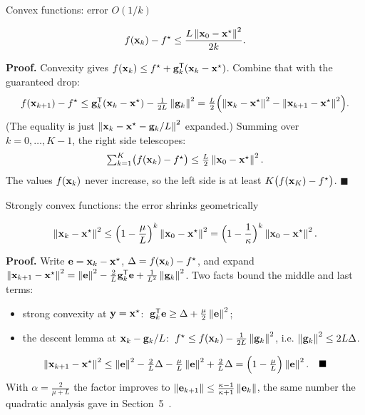 \begin{frame}{Convex functions: error $O(1/k)$}
  \begin{thmbox}[Theorem ($L$-smooth, convex, $\alpha = 1/L$)]
    \[ f(\mathbf{x}_k) - f^\star \le \frac{L\left\lVert \mathbf{x}_0-\mathbf{x}^\star \right\rVert^2}{2k}. \]
  \end{thmbox}
  \small\textbf{Proof.}
  \pause
  Convexity gives $f(\mathbf{x}_k)\le f^\star + \mathbf{g}_k^{\mathsf T}(\mathbf{x}_k-\mathbf{x}^\star)$. Combine that with the guaranteed drop:
  \[
    f(\mathbf{x}_{k+1}) - f^\star \le \mathbf{g}_k^{\mathsf T}(\mathbf{x}_k-\mathbf{x}^\star) - \tfrac{1}{2L}\left\lVert \mathbf{g}_k \right\rVert^2
    = \tfrac L2\Bigl(\left\lVert \mathbf{x}_k-\mathbf{x}^\star \right\rVert^2 - \left\lVert \mathbf{x}_{k+1}-\mathbf{x}^\star \right\rVert^2\Bigr).
  \]
  \pause
  (The equality is just $\left\lVert \mathbf{x}_k - \mathbf{x}^\star - \mathbf{g}_k/L \right\rVert^2$ expanded.) Summing over $k = 0,\dots,K-1$, the right side
  telescopes:
  \[
    \textstyle\sum_{k=1}^{K}\bigl(f(\mathbf{x}_k)-f^\star\bigr)\le\tfrac L2\left\lVert \mathbf{x}_0-\mathbf{x}^\star \right\rVert^2 .
  \]
  \pause
  The values $f(\mathbf{x}_k)$ never increase, so the left side is at least $K\bigl(f(\mathbf{x}_K)-f^\star\bigr)$. $\blacksquare$
\end{frame}

\begin{frame}{Strongly convex functions: the error shrinks geometrically}
  \begin{thmbox}[Theorem ($L$-smooth, $\mu$-strongly convex, $\alpha = 1/L$)]
    \[ \left\lVert \mathbf{x}_{k}-\mathbf{x}^\star \right\rVert^2 \le \Bigl(1-\frac{\mu}{L}\Bigr)^{k}\left\lVert \mathbf{x}_0-\mathbf{x}^\star \right\rVert^2 = \Bigl(1-\frac1\kappa\Bigr)^k\left\lVert \mathbf{x}_0-\mathbf{x}^\star \right\rVert^2. \]
  \end{thmbox}
  \small\textbf{Proof.} Write $\mathbf{e} = \mathbf{x}_k-\mathbf{x}^\star$, $\Delta = f(\mathbf{x}_k)-f^\star$, and expand
  $\left\lVert \mathbf{x}_{k+1}-\mathbf{x}^\star \right\rVert^2 = \left\lVert \mathbf{e} \right\rVert^2 - \tfrac2L\mathbf{g}_k^{\mathsf T}\mathbf{e} + \tfrac1{L^2}\left\lVert \mathbf{g}_k \right\rVert^2$. Two facts bound the middle and last terms:
  \pause
  \begin{itemize}\footnotesize
    \item strong convexity at $\mathbf{y}=\mathbf{x}^\star$: $\;\mathbf{g}_k^{\mathsf T}\mathbf{e}\ge\Delta+\tfrac\mu2\left\lVert \mathbf{e} \right\rVert^2$;
    \item the descent lemma at $\mathbf{x}_k-\mathbf{g}_k/L$: $\;f^\star\le f(\mathbf{x}_k)-\tfrac1{2L}\left\lVert \mathbf{g}_k \right\rVert^2$, i.e. $\left\lVert \mathbf{g}_k \right\rVert^2\le2L\Delta$.
  \end{itemize}
  \pause
  \[
    \left\lVert \mathbf{x}_{k+1}-\mathbf{x}^\star \right\rVert^2\le\left\lVert \mathbf{e} \right\rVert^2-\tfrac2L\Delta-\tfrac\mu L\left\lVert \mathbf{e} \right\rVert^2+\tfrac2L\Delta
    =\Bigl(1-\tfrac\mu L\Bigr)\left\lVert \mathbf{e} \right\rVert^2. \quad\blacksquare
  \]
  \pause
  \footnotesize With $\alpha = \frac{2}{\mu+L}$ the factor improves to $\left\lVert \mathbf{e}_{k+1} \right\rVert\le\frac{\kappa-1}{\kappa+1}\left\lVert \mathbf{e}_k \right\rVert$,
  the same number the quadratic analysis gave in Section~5~\cite{nesterov2018}.
\end{frame}

